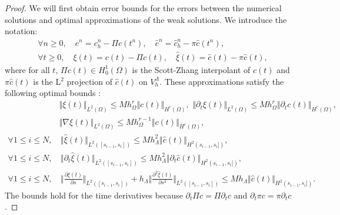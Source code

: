 \documentclass[pdflatex,sn-mathphys-num]{sn-jnl}%
\theoremstyle{thmstyleone}%
\theoremstyle{thmstyletwo}%
\theoremstyle{thmstylethree}%
\begin{document}
\begin{proof}
We will first obtain error bounds for the errors between the numerical solutions and optimal approximations of the weak solutions. We introduce the notation:
\begin{align*}
\forall n\geq 0, \quad e^n = c_h^n - \Pi c(t^n), \quad
\hat e^n  = \hat c_h^n - \pi \hat c(t^n),\\
\forall t\geq 0, \quad \xi(t) = c(t) - \Pi c(t), \quad
\hat \xi(t)  = \hat c(t) - \pi \hat c(t),
\end{align*}
where for all $t$, $\Pi c(t) \in H^1_0(\Omega)$ is the Scott-Zhang interpolant of $c(t)$ and  $\pi \hat c(t)$ is the L$^2$ projection of $\hat c(t)$ on $V_h^\Lambda$. These approximations satisfy the following optimal bounds \cite{BernardiGiraultETALBook}:
\begin{align}
    & \Vert \xi(t) \Vert_{L^2(\Omega)} \leq M h_\Omega^{r} \Vert c(t)\Vert_{H^r(\Omega)},\,\,
    \Vert \partial_t\xi(t) \Vert_{L^2(\Omega)} \leq M h_\Omega^{r} \Vert \partial_t c(t)\Vert_{H^r(\Omega)}, \label{eq:approxL2c}
    \\
    &\Vert \nabla \xi(t) \Vert_{L^2(\Omega)} \leq M h_\Omega^{r-1} \Vert c(t)\Vert_{H^r(\Omega)},\label{eq:approxgradc}
    \\
    \forall 1\leq i\leq N, & \, \Vert \hat \xi(t)\Vert_{L^2([s_{i-1},s_i])} \leq M h_\Lambda^2 \Vert \hat c(t) \Vert_{H^2(s_{i-1},s_i])},\label{eq:approxL2hatc}\\
    \forall 1\leq i\leq N, & \, \Vert \partial_t \hat \xi(t)\Vert_{L^2([s_{i-1},s_i])} \leq M h_\Lambda^2 \Vert \partial_t \hat c(t) \Vert_{H^2(s_{i-1},s_i])},\label{eq:approxL2hatderc}
    \\
    \forall 1\leq i\leq N, & \, \Vert \frac{\partial\hat \xi(t)}{\partial s} \Vert_{L^2([s_{i-1},s_i])} 
    + h_\Lambda \Vert \frac{\partial^2\hat \xi(t)}{\partial s^2} \Vert_{L^2([s_{i-1},s_i])} 
    \leq M h_\Lambda \Vert \hat c(t) \Vert_{H^2(s_{i-1},s_i])}.\label{eq:approxgradhatc}
\end{align}
The bounds hold for the time derivatives because $\partial_t \Pi c = \Pi \partial_t c$ and $\partial_t \pi c = \pi \partial_t c$.



\end{proof}
\end{document}
